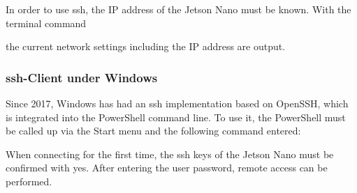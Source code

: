 \bigskip

In order to use \ac{ssh}, the IP address of the Jetson Nano must be known. With the terminal command

\medskip


\medskip

the current network settings including the IP address are output.


%
%
%
%
%

%
%
%
%
%
%



\subsubsection{\ac{ssh}-Client under Windows}


Since 2017, Windows has had an \ac{ssh} implementation based on OpenSSH, which is integrated into the PowerShell command line. To use it, the PowerShell must be called up via the Start menu and the following command entered:

\medskip


\medskip

When connecting for the first time, the \ac{ssh} keys of the Jetson Nano must be confirmed with \glqq yes\grqq{}. After entering the user password, remote access can be performed.



